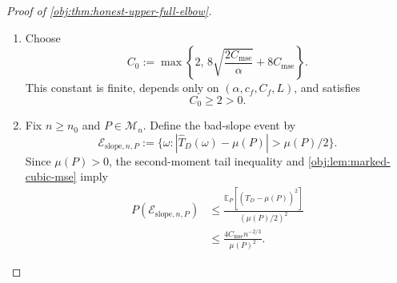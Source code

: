 \documentclass[11pt]{article}
\begin{document}
\begin{proof}[Proof of \cref{obj:thm:honest-upper-full-elbow}]
\begin{enumerate}
For coverage, fix \(P\in\mathcal M_n\).
 supplies
\[
\mu(P)=T_D(P)>0,\qquad
\theta(P)=\frac{T_Y(P)}{\mu(P)}\in[-1,1],
\qquad
T_Y(P)=\theta(P)\mu(P).
\]
If \(n<n_0\), the interval equals \(\Theta\), and therefore
\[
P\{\theta(P)\in I_n\}=1\ge1-\alpha.
\]
Suppose now that \(n\ge n_0\). For each \(A\in\{Y,D\}\), define the error event
\[
\mathcal E_{A,n}
:=
\{\omega:|\widehat T_A(\omega)-T_A(P)|>r_n\}.
\]
The radius is strictly positive and satisfies
\[
r_n^2=\frac{2C_{\mathrm{mse}}}{\alpha}\,n^{-2/3}.
\]
Applying the second-moment tail inequality and
\cref{obj:lem:marked-cubic-mse} gives
\[
P(\mathcal E_{A,n})
\le
\frac{\mathbb E_P[(\widehat T_A-T_A(P))^2]}{r_n^2}
\le
\frac{C_{\mathrm{mse}}n^{-2/3}}
     {(2C_{\mathrm{mse}}/\alpha)n^{-2/3}}
=\frac{\alpha}{2}.
\]

Define the simultaneous good event by
\[
\mathcal E_{\mathrm{cov},n}
:=(\mathcal E_{Y,n}\cup\mathcal E_{D,n})^c.
\]
On this event, identification and the triangle inequality yield
\[
\begin{aligned}
|\widehat T_Y-\theta(P)\widehat T_D|
&=
|(\widehat T_Y-T_Y(P))
 +\theta(P)(\mu(P)-\widehat T_D)|\\
&\le|\widehat T_Y-T_Y(P)|
  +|\theta(P)|\,|\widehat T_D-\mu(P)|\\
&\le2r_n.
\end{aligned}
\]
Hence \(\theta(P)\in\mathcal A_n\), so the acceptance set is nonempty and
\(\theta(P)\in I_n\). The union bound therefore gives
\[
P\{\theta(P)\in I_n\}
\ge P(\mathcal E_{\mathrm{cov},n})
\ge1-P(\mathcal E_{Y,n})-P(\mathcal E_{D,n})
\ge1-\alpha.
\]
Together with the measurable graph and connectedness established above,
this proves \(I_n\in\mathfrak H_n\) for every positive integer \(n\), by
\cref{obj:def:honest-intervals}.

\item
Choose
\[
C_0:=
\max\left\{
2,\,
8\sqrt{\frac{2C_{\mathrm{mse}}}{\alpha}}
+8C_{\mathrm{mse}}
\right\}.
\]
This constant is finite, depends only on
\((\alpha,c_f,C_f,L)\), and satisfies
\[
C_0\ge2>0.
\]

\item
Fix \(n\ge n_0\) and \(P\in\mathcal M_n\). Define the bad-slope event by
\[
\mathcal E_{\mathrm{slope},n,P}
:=
\{\omega:|\widehat T_D(\omega)-\mu(P)|>\mu(P)/2\}.
\]
Since \(\mu(P)>0\), the second-moment tail inequality and
\cref{obj:lem:marked-cubic-mse} imply
\[
\begin{aligned}
P(\mathcal E_{\mathrm{slope},n,P})
&\le
\frac{\mathbb E_P[(\widehat T_D-\mu(P))^2]}
     {(\mu(P)/2)^2}\\
&\le
\frac{4C_{\mathrm{mse}}n^{-2/3}}{\mu(P)^2}.
\end{aligned}
\]


\end{enumerate}
\end{proof}
\end{document}

